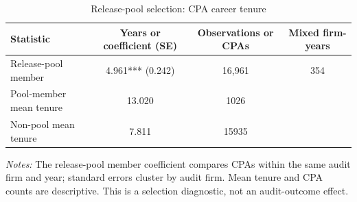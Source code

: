 \begin{table}[htbp]
\footnotesize
\centering
\caption{Release-pool selection: CPA career tenure}
\begin{threeparttable}
\begin{tabular}{p{}ccc}
\toprule
Statistic & Years or coefficient (SE) & Observations or CPAs & Mixed firm-years \\
\midrule
Release-pool member & 4.961*** (0.242) & 16,961 & 354 \\
Pool-member mean tenure & 13.020 & 1026 &  \\
Non-pool mean tenure & 7.811 & 15935 &  \\
\bottomrule
\end{tabular}
\begin{tablenotes}\footnotesize
\item \raggedright \textit{Notes:} The release-pool member coefficient compares CPAs within the same audit firm and year; standard errors cluster by audit firm. Mean tenure and CPA counts are descriptive. This is a selection diagnostic, not an audit-outcome effect.
\end{tablenotes}
\end{threeparttable}
\end{table}
